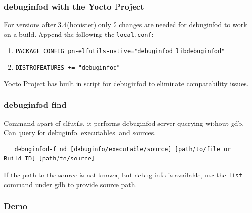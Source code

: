 \documentclass[12pt]{beamer}
\begin{document}
\begin{frame}[fragile]
   \frametitle{ debuginfod with the Yocto Project}
   For versions after 3.4(honister) only 2 changes are needed for debuginfod
   to work on a build. Append the following the \verb|local.conf|:
   \begin{small}
   \begin{enumerate}
      \item \verb|PACKAGE_CONFIG_pn-elfutils-native="debuginfod libdebuginfod"|
      \item \verb|DISTROFEATURES += "debuginfod"|
   \end{enumerate}
   \end{small}
   Yocto Project has built in script for debuginfod to eliminate compatability issues. 
\end{frame}

\begin{frame}[fragile]
   \frametitle{ debuginfod-find}
   Command apart of elfutils, it performs debuginfod server querying without gdb. Can query for
   debuginfo, executables, and sources. 
   \begin{tiny}
   \begin{verbatim}
   debuginfod-find [debuginfo/executable/source] [path/to/file or Build-ID] [path/to/source]
   \end{verbatim}
   \end{tiny}
   If the path to the source is not known, but debug info is available, use the \verb|list| command
   under gdb to provide source path. 

\end{frame}

\begin{frame}
   \frametitle{ Demo }
\end{frame}
\end{document}
